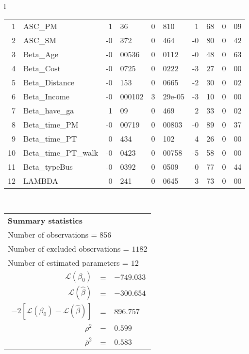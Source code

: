 \begin{tabular}{l}
\begin{tabular}{rlr@{.}lr@{.}lr@{.}lr@{.}l}
1 & ASC_PM  & 1&36 & 0&810 & 1&68 & 0&09\\
2 & ASC_SM & -0&372 & 0&464 & -0&80 & 0&42\\
3 & Beta_Age & -0&00536 & 0&0112 & -0&48 & 0&63\\
4 & Beta_Cost & -0&0725 & 0&0222 & -3&27 & 0&00\\
5 & Beta_Distance & -0&153 & 0&0665 & -2&30 & 0&02\\
6 & Beta_Income & -0&000102 & 3&29e-05 & -3&10 & 0&00\\
7 & Beta_have_ga & 1&09 & 0&469 & 2&33 & 0&02\\
8 & Beta_time_PM & -0&00719 & 0&00803 & -0&89 & 0&37\\
9 & Beta_time_PT & 0&434 & 0&102 & 4&26 & 0&00\\
10 & Beta_time_PT_walk & -0&0423 & 0&00758 & -5&58 & 0&00\\
11 & Beta_typeBus & -0&0392 & 0&0509 & -0&77 & 0&44\\
12 & LAMBDA & 0&241 & 0&0645 & 3&73 & 0&00\\
\hline
\end{tabular}
\\
\begin{tabular}{rcl}
\multicolumn{3}{l}{\bf Summary statistics}\\
\multicolumn{3}{l}{ Number of observations = $856$} \\
\multicolumn{3}{l}{ Number of excluded observations = $1182$} \\
\multicolumn{3}{l}{ Number of estimated  parameters = $12$} \\
 $\mathcal{L}(\beta_0)$ &=&  $-749.033$ \\
 $\mathcal{L}(\hat{\beta})$ &=& $-300.654 $  \\
 $-2[\mathcal{L}(\beta_0) -\mathcal{L}(\hat{\beta})]$ &=& $896.757$ \\
    $\rho^2$ &=&   $0.599$ \\
    $\bar{\rho}^2$ &=&    $0.583$ \\
\end{tabular}
  \end{tabular}

